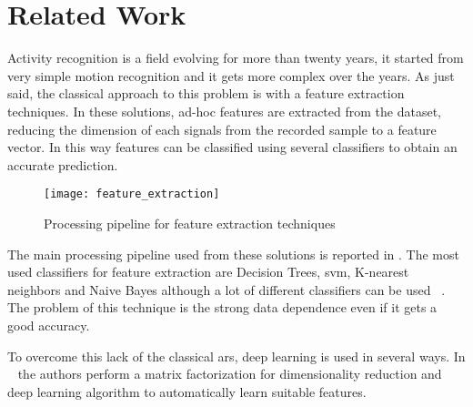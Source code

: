 
\section{Related Work}
\label{sec:related_work}

Activity recognition is a field evolving for more than twenty years, it started from very simple motion recognition and it gets more complex over the years.
As just said, the classical approach to this problem is with a feature extraction techniques.
In these solutions, ad-hoc features are extracted from the dataset, reducing the dimension of each signals from the recorded sample to a feature vector.
In this way features can be classified using several classifiers to obtain an accurate prediction.

\begin{figure}[!ht]
  \centering
  \texttt{[image: feature\_extraction]}
  \label{fig:feature_extraction}
  \caption{Processing pipeline for feature extraction techniques}
\end{figure}

The main processing pipeline used from these solutions is reported in .
The most used classifiers for feature extraction are Decision Trees, \gls{svm}, K-nearest neighbors and Naive Bayes although a lot of different classifiers can be used ~\cite{Ravi05}.
The problem of this technique is the strong data dependence even if it gets a good accuracy.

To overcome this lack of the classical \gls{ars}, deep learning is used in several ways.
In ~\cite{Chikhaoui17} the authors perform a matrix factorization for dimensionality reduction and deep learning algorithm to automatically learn suitable features.

